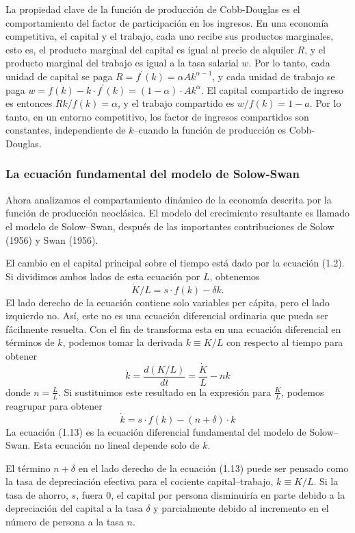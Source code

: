 La propiedad clave de la función de producción de Cobb-Douglas es el comportamiento del factor de participación en los ingresos. En una economía competitiva, el capital y el trabajo, cada uno recibe sus productos marginales, esto es, el producto marginal del capital es igual al precio de alquiler $R$, y el producto marginal del trabajo es igual a la tasa salarial $w$. Por lo tanto, cada unidad de capital se paga $R=f^{\prime}\left(k\right)=\alpha Ak^{\alpha-1}$, y cada unidad de trabajo se paga $w=f\left(k\right)-k\cdot f^{\prime}\left(k\right)=\left(1-\alpha\right)\cdot Ak^{\alpha}$. El capital compartido de ingreso es entonces $Rk/f\left(k\right)=\alpha$, y el trabajo compartido es $w/f\left(k\right)=1-a$. Por lo tanto, en un entorno competitivo, los factor de ingresos compartidos son constantes, independiente de $k$--cuando la función de producción es Cobb-Douglas.

\subsubsection{La ecuación fundamental del modelo de Solow-Swan}

Ahora analizamos el compartamiento dinámico de la economía descrita por la función de producción neoclásica. El modelo del crecimiento resultante es llamado el modelo de Solow--Swan, después de las importantes contribuciones de Solow (1956) y Swan (1956).

El cambio en el capital principal sobre el tiempo está dado por la ecuación (1.2). Si dividimos ambos lados de esta ecuación por $L$, obtenemos \[ \dot{K}/L=s\cdot f\left(k\right)-\delta k. \] El lado derecho de la ecuación contiene solo variables per cápita, pero el lado izquierdo no. Así, este no es una ecuación diferencial ordinaria que pueda ser fácilmente resuelta. Con el fin de transforma esta en una ecuación diferencial en términos de $k$, podemos tomar la derivada $k\equiv K/L$ con respecto al tiempo para obtener \[ \dot{k}=\frac{d\left(K/L\right)}{dt}=\frac{\dot{K}}{L}-nk \] donde $n=\frac{\dot{L}}{L}$. Si sustituimos este resultado en la expresión para $\frac{\dot{K}}{L}$, podemos reagrupar para obtener
\begin{equation}
\dot{k}=s\cdot f\left(k\right)-\left(n+\delta\right)\cdot k
\end{equation}
La ecuación (1.13) es la ecuación diferencial fundamental del modelo de Solow--Swan. Esta ecuación no lineal depende solo de $k$.

El término $n+\delta$ en el lado derecho de la ecuación (1.13) puede ser pensado como la tasa de depreciación efectiva para el cociente capital--trabajo, $k\equiv K/L$. Si la tasa de ahorro, $s$, fuera $0$, el capital por persona disminuiría en parte debido a la depreciación del capital a la tasa $\delta$ y parcialmente debido al incremento en el número de persona a la tasa $n$.

